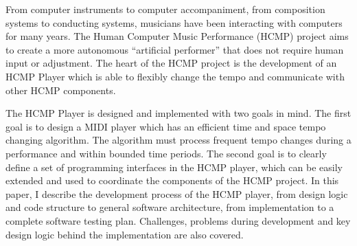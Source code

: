 \begin{abstracts}
From computer instruments to computer accompaniment, from composition
systems to conducting systems, musicians have been interacting with
computers for many years. The Human Computer Music Performance (HCMP)
project aims to create a more autonomous ``artificial  performer'' that does
not require human input or adjustment. The heart of the HCMP project is the
development of an HCMP Player which is able to flexibly change the tempo and
communicate with other HCMP components.

The HCMP Player is designed and implemented with two goals in mind. The
first goal is to design a MIDI player which has an efficient time and space
tempo changing algorithm. The algorithm must process frequent tempo changes
during a performance and within bounded time periods. The second goal is to
clearly define a set of programming interfaces in the HCMP player, which can
be easily extended and used to coordinate the components of the HCMP
project. In this paper, I describe the development process of the HCMP
player, from design logic and code structure to general software
architecture, from implementation to a complete software testing plan.
Challenges, problems during development and key design logic behind the
implementation are also covered.
\end{abstracts}

